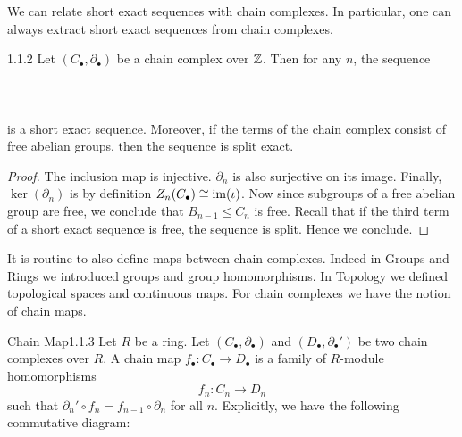 \documentclass[a4paper]{article}
\begin{document}
We can relate short exact sequences with chain complexes. In particular, one can always extract short exact sequences from chain complexes. 

\begin{lmm}{}{1.1.2} Let $(C_\bullet,\partial_\bullet)$ be a chain complex over $\mathbb{Z}$. Then for any $n$, the sequence \\~\\
\\~\\
is a short exact sequence. Moreover, if the terms of the chain complex consist of free abelian groups, then the sequence is split exact. \tcbline
\begin{proof}
The inclusion map is injective. $\partial_n$ is also surjective on its image. Finally, $\ker(\partial_n)$ is by definition $Z_n(C_\bullet)\cong\operatorname{im}(\iota)$. Now since subgroups of a free abelian group are free, we conclude that $B_{n-1}\leq C_n$ is free. Recall that if the third term of a short exact sequence is free, the sequence is split. Hence we conclude. 
\end{proof}
\end{lmm}

It is routine to also define maps between chain complexes. Indeed in Groups and Rings we introduced groups and group homomorphisms. In Topology we defined topological spaces and continuous maps. For chain complexes we have the notion of chain maps. 

\begin{defn}{Chain Map}{1.1.3} Let $R$ be a ring. Let $(C_\bullet,\partial_\bullet)$ and $(D_\bullet,\partial_\bullet')$ be two chain complexes over $R$. A chain map $f_\bullet:C_\bullet\to D_\bullet$ is a family of $R$-module homomorphisms $$f_n:C_n\to D_n$$ such that $\partial_n'\circ f_n=f_{n-1}\circ\partial_n$ for all $n$. Explicitly, we have the following commutative diagram: \\~\\
\end{defn}
\end{document}
